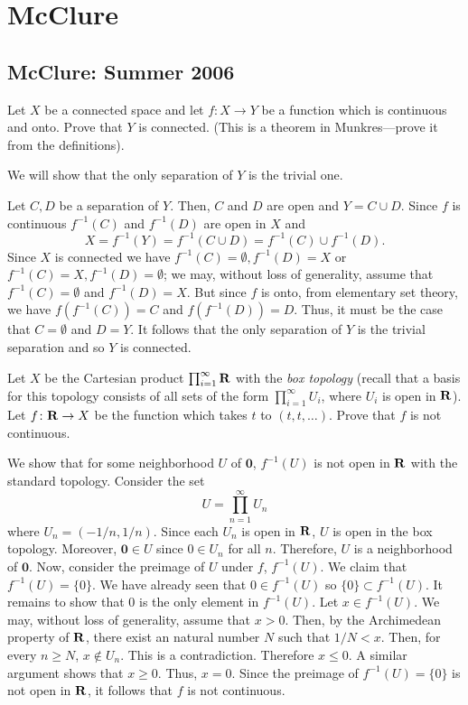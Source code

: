 \section{McClure}
\subsection{McClure: Summer 2006}
\setcounter{exercise}{0}
\setcounter{equation}{0}

\begin{problem}
  Let $X$ be a connected space and let $f\colon X\to Y$ be a function which
  is continuous and onto. Prove that $Y$ is connected. (This is a theorem
  in Munkres---prove it from the definitions).
\end{problem}
\begin{solution}
  We will show that the only separation of $Y$ is the trivial one.

  Let $C,D$ be a separation of $Y$. Then, $C$ and $D$ are open and $Y=C\cup
  D$. Since $f$ is continuous $f^{-1}(C)$ and $f^{-1}(D)$ are open in $X$
  and
  \[
    X=f^{-1}(Y)=f^{-1}(C\cup D)=f^{-1}(C)\cup f^{-1}(D).
  \]
  Since $X$ is connected we have $f^{-1}(C)=\emptyset,f^{-1}(D)=X$ or
  $f^{-1}(C)=X,f^{-1}(D)=\emptyset$; we may, without loss of generality,
  assume that $f^{-1}(C)=\emptyset$ and $f^{-1}(D)=X$. But since $f$ is
  onto, from elementary set theory, we have $f(f^{-1}(C))=C$ and
  $f(f^{-1}(D))=D$. Thus, it must be the case that $C=\emptyset$ and
  $D=Y$. It follows that the only separation of $Y$ is the trivial
  separation and so $Y$ is connected.
\end{solution}

\begin{problem}
  Let $X$ be the Cartesian product $\prod_{i=1}^\infty\mathbf{R}$ with the
  \emph{box topology} (recall that a basis for this topology consists of
  all sets of the form $\prod_{i=1}^\infty U_i$, where $U_i$ is open in
  $\mathbf{R}$). Let $f\colon\mathbf{R}\to X$ be the function which takes $t$ to
  $(t,t,\ldots)$. Prove that $f$ is not continuous.
\end{problem}
\begin{solution}
  We show that for some neighborhood $U$ of $\mathbf{0}$, $f^{-1}(U)$ is
  not open in $\mathbf{R}$ with the standard topology. Consider the set
  \[
    U=\prod_{n=1}^\infty U_n
  \]
  where $U_n=(-1/n,1/n)$. Since each $U_n$ is open in $\mathbf{R}$, $U$ is open
  in the box topology. Moreover, $\mathbf{0}\in U$ since $0\in U_n$ for all
  $n$. Therefore, $U$ is a neighborhood of $\mathbf{0}$. Now, consider the
  preimage of $U$ under $f$, $f^{-1}(U)$. We claim that
  $f^{-1}(U)=\{0\}$. We have already seen that $0\in f^{-1}(U)$ so
  $\{0\}\subset f^{-1}(U)$. It remains to show that $0$ is the only element
  in $f^{-1}(U)$. Let $x\in f^{-1}(U)$. We may, without loss of generality,
  assume that $x>0$. Then, by the Archimedean property of $\mathbf{R}$, there
  exist an natural number $N$ such that $1/N<x$. Then, for every $n\geq N$,
  $x\notin U_n$. This is a contradiction. Therefore $x\leq 0$. A similar
  argument shows that $x\geq 0$. Thus, $x=0$. Since the preimage of
  $f^{-1}(U)=\{0\}$ is not open in $\mathbf{R}$, it follows that $f$ is not
  continuous.
\end{solution}

